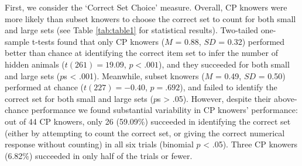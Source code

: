 \documentclass[
  man,floatsintext]{apa7}
\begin{document}
First, we consider the `Correct Set Choice' measure. Overall, CP knowers were more likely than subset knowers to choose the correct set to count for both small and large sets (see Table \ref{tab:table1} for statistical results).
Two-tailed one-sample t-tests found that only CP knowers (\(M\) = 0.88, \(SD\) = 0.32) performed better than chance at identifying the correct item set to infer the number of hidden animals (\(t(261) = 19.09\), \(p < .001\)), and they succeeded for both small and large sets (\(p\)s \textless{} .001). Meanwhile, subset knowers (\(M\) = 0.49, \(SD\) = 0.50) performed at chance (\(t(227) = -0.40\), \(p = .692\)), and failed to identify the correct set for both small and large sets (\(p\)s \textgreater{} .05).
However, despite their above-chance performance we found substantial variability in CP knowers' performance: out of 44 CP knowers, only 26 (59.09\%) succeeded in identifying the correct set (either by attempting to count the correct set, or giving the correct numerical response without counting) in all six trials (binomial \(p\) \textless{} .05). Three CP knowers (6.82\%) succeeded in only half of the trials or fewer.
\end{document}

